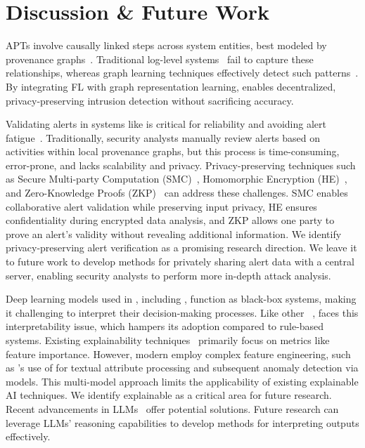 \section{Discussion \& Future Work}
\label{sec:discussion}


 APTs involve causally linked steps across system entities, best modeled by provenance graphs~\cite{inam2023sok}. Traditional log-level systems~\cite{deeplog2017,liu2019log2vec,xia2019loggan} fail to capture these relationships, whereas graph learning techniques effectively detect such patterns~\cite{flash2024,cheng2023kairos,jia2023magic}. By integrating FL with graph representation learning, \Sys enables decentralized, privacy-preserving intrusion detection without sacrificing accuracy.



 Validating alerts in systems like \Sys is critical for reliability and avoiding alert fatigue~\cite{nodoze2019}. Traditionally, security analysts manually review alerts based on activities within local provenance graphs, but this process is time-consuming, error-prone, and lacks scalability and privacy. Privacy-preserving techniques such as Secure Multi-party Computation (SMC)~\cite{goldreich1998secure}, Homomorphic Encryption (HE)~\cite{yi2014homomorphic}, and Zero-Knowledge Proofs (ZKP)~\cite{fiege1987zero} can address these challenges. SMC enables collaborative alert validation while preserving input privacy, HE ensures confidentiality during encrypted data analysis, and ZKP allows one party to prove an alert's validity without revealing additional information. We identify privacy-preserving alert verification as a promising research direction. We leave it to future work to develop methods for privately sharing alert data with a central server, enabling security analysts to perform more in-depth attack analysis.

 Deep learning models used in \pids, including \Sys, function as black-box systems, making it challenging to interpret their decision-making processes. Like other \pids~\cite{flash2024,cheng2023kairos,yangprographer}, \Sys faces this interpretability issue, which hampers its adoption compared to rule-based systems. Existing explainability techniques~\cite{antwarg2021explaining,brown2018recurrent,ardito2021revisiting,hwang2021sfd} primarily focus on metrics like feature importance. However, modern \pids employ complex feature engineering, such as \flash's use of \wordvec for textual attribute processing and subsequent anomaly detection via \gnn models. This multi-model approach limits the applicability of existing explainable AI techniques. We identify explainable \pids as a critical area for future research. Recent advancements in LLMs~\cite{chang2024survey} offer potential solutions. Future research can leverage LLMs' reasoning capabilities to develop methods for interpreting \pids outputs effectively.


